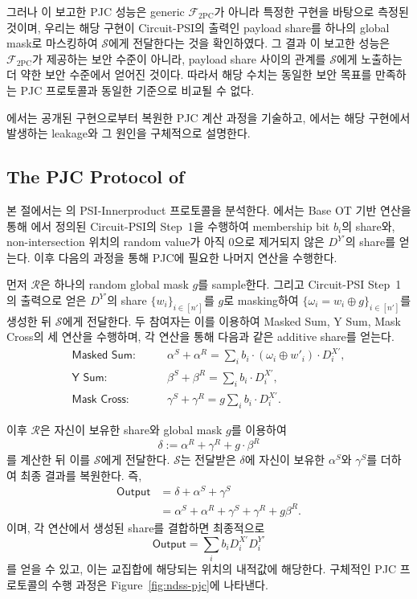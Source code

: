\documentclass[sigconf,anonymous,review]{acmart}
\begin{document}
그러나 \cite{LTS+26}이 보고한 PJC 성능은 generic $\mathcal{F}_{\mathrm{2PC}}$가 아니라 특정한 구현을 바탕으로 측정된 것이며, 우리는 해당 구현이 Circuit-PSI의 출력인 payload share를 하나의 global mask로 마스킹하여 $\mathcal{S}$에게 전달한다는 것을 확인하였다. 그 결과 \cite{LTS+26}이 보고한 성능은 $\mathcal{F}_{\mathrm{2PC}}$가 제공하는 보안 수준이 아니라, payload share 사이의 관계를 $\mathcal{S}$에게 노출하는 더 약한 보안 수준에서 얻어진 것이다. 따라서 해당 수치는 동일한 보안 목표를 만족하는 PJC 프로토콜과 동일한 기준으로 비교될 수 없다.

에서는 공개된 구현으로부터 복원한 PJC 계산 과정을 기술하고, 에서는 해당 구현에서 발생하는 leakage와 그 원인을 구체적으로 설명한다.


\subsection{The PJC Protocol of~\cite{LTS+26}}\label{sec:LTSprotocol}
본 절에서는 \cite{LTS+26}의 PSI-Innerproduct 프로토콜을 분석한다.
\cite{LTS+26}에서는 Base OT 기반 연산을 통해 에서 정의된 Circuit-PSI의 Step~1을 수행하여
membership bit $b_i$의 share와, non-intersection 위치의 random value가
아직 0으로 제거되지 않은 $D^{Y'}$의 share를 얻는다.
이후 다음의 과정을 통해 PJC에 필요한 나머지 연산을 수행한다.

먼저 $\mathcal{R}$은 하나의 random global mask $g$를 sample한다.
그리고 Circuit-PSI Step~1의 출력으로 얻은 $D^{Y'}$의 share
$\{w_i\}_{i\in[n']}$를 $g$로 masking하여
$\{\omega_i = w_i\oplus g\}_{i\in[n']}$를 생성한 뒤 $\mathcal{S}$에게 전달한다.
두 참여자는 이를 이용하여
\textsf{Masked Sum}, \textsf{Y Sum}, \textsf{Mask Cross}의 세 연산을
수행하며, 각 연산을 통해 다음과 같은 additive share를 얻는다.
\[
\begin{aligned}
\textsf{Masked Sum:}\qquad
&\alpha^S+\alpha^R
    =\sum_i b_i \cdot (\omega_i \oplus w'_i) \cdot D_i^{X'},\\
\textsf{Y Sum:}\qquad
&\beta^S+\beta^R
    =\sum_i b_i \cdot D_i^{X'},\\
\textsf{Mask Cross:}\qquad
&\gamma^S+\gamma^R
    =g\sum_i b_i \cdot D_i^{X'}.
\end{aligned}
\]

이후 $\mathcal{R}$은 자신이 보유한 share와 global mask $g$를 이용하여
\[
\delta
:=
\alpha^R+\gamma^R+g \cdot \beta^R
\]
를 계산한 뒤 이를 $\mathcal{S}$에게 전달한다.
$\mathcal{S}$는 전달받은 $\delta$에 자신이 보유한
$\alpha^S$와 $\gamma^S$를 더하여 최종 결과를 복원한다. 즉,
\[
\begin{aligned}
\mathsf{Output}
    &=\delta+\alpha^S+\gamma^S\\
    &=\alpha^S+\alpha^R+\gamma^S+\gamma^R+g\beta^R.
\end{aligned}
\]
이며, 각 연산에서 생성된 share를 결합하면 최종적으로
\[
\mathsf{Output}
=
\sum_i b_iD_i^{X'}D_i^{Y'}
\]
를 얻을 수 있고, 이는 교집합에 해당되는 위치의 내적값에 해당한다.
구체적인 PJC 프로토콜의 수행 과정은
Figure~\ref{fig:ndss-pjc}에 나타낸다.
\end{document}
